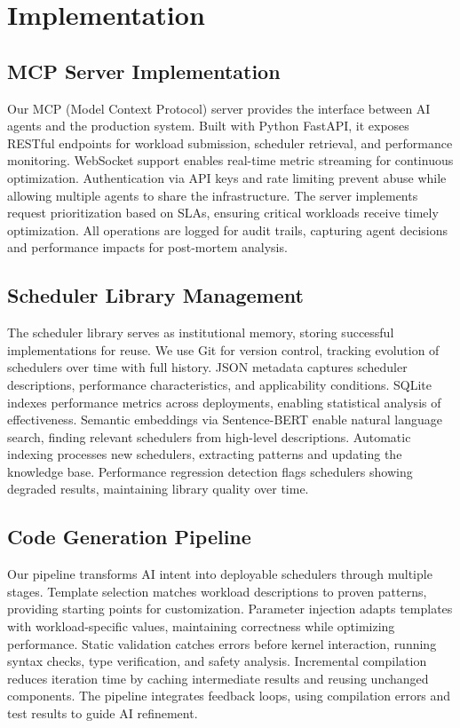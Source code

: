 \section{Implementation}

\subsection{MCP Server Implementation}

Our MCP (Model Context Protocol) server provides the interface between AI agents and the production system. Built with Python FastAPI, it exposes RESTful endpoints for workload submission, scheduler retrieval, and performance monitoring. WebSocket support enables real-time metric streaming for continuous optimization. Authentication via API keys and rate limiting prevent abuse while allowing multiple agents to share the infrastructure. The server implements request prioritization based on SLAs, ensuring critical workloads receive timely optimization. All operations are logged for audit trails, capturing agent decisions and performance impacts for post-mortem analysis.

\subsection{Scheduler Library Management}

The scheduler library serves as institutional memory, storing successful implementations for reuse. We use Git for version control, tracking evolution of schedulers over time with full history. JSON metadata captures scheduler descriptions, performance characteristics, and applicability conditions. SQLite indexes performance metrics across deployments, enabling statistical analysis of effectiveness. Semantic embeddings via Sentence-BERT enable natural language search, finding relevant schedulers from high-level descriptions. Automatic indexing processes new schedulers, extracting patterns and updating the knowledge base. Performance regression detection flags schedulers showing degraded results, maintaining library quality over time.

\subsection{Code Generation Pipeline}

Our pipeline transforms AI intent into deployable schedulers through multiple stages. Template selection matches workload descriptions to proven patterns, providing starting points for customization. Parameter injection adapts templates with workload-specific values, maintaining correctness while optimizing performance. Static validation catches errors before kernel interaction, running syntax checks, type verification, and safety analysis. Incremental compilation reduces iteration time by caching intermediate results and reusing unchanged components. The pipeline integrates feedback loops, using compilation errors and test results to guide AI refinement.

